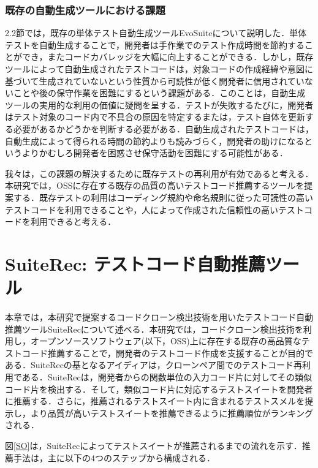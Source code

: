 \documentclass[12pt]{jarticle} %
\begin{document}
\subsubsection{既存の自動生成ツールにおける課題}

2.2節では，既存の単体テスト自動生成ツール{\sf EvoSuite}について説明した．単体テストを自動生成することで，開発者は手作業でのテスト作成時間を節約することができ，またコードカバレッジを大幅に向上することができる．しかし，既存ツールによって自動生成されたテストコードは，対象コードの作成経緯や意図に基づいて生成されていないという性質から可読性が低く開発者に信用されていないことや後の保守作業を困難にするという課題がある\cite{b14,b15,b13}．このことは，自動生成ツールの実用的な利用の価値に疑問を呈する．テストが失敗するたびに，開発者はテスト対象のコード内で不具合の原因を特定するまたは，テスト自体を更新する必要があるかどうかを判断する必要がある．自動生成されたテストコードは，自動生成によって得られる時間の節約よりも読みづらく，開発者の助けになるというよりかむしろ開発者を困惑させ保守活動を困難にする可能性がある\cite{b1}．


我々は，この課題の解決するために既存テストの再利用が有効であると考える．本研究では，OSSに存在する既存の品質の高いテストコード推薦するツールを提案する．既存テストの利用はコーディング規約や命名規則に従った可読性の高いテストコードを利用できることや，人によって作成された信頼性の高いテストコードを利用できると考える．


\newpage
\section{SuiteRec: テストコード自動推薦ツール}

本章では，本研究で提案するコードクローン検出技術を用いたテストコード自動推薦ツール{\sf SuiteRec}について述べる．本研究では，コードクローン検出技術を利用し，オープンソースソフトウェア(以下，OSS)上に存在する既存の高品質なテストコード推薦することで，開発者のテストコード作成を支援することが目的である．{\sf SuiteRec}の基となるアイディアは，クローンペア間でのテストコード再利用である．{\sf SuiteRec}は，開発者からの関数単位の入力コード片に対してその類似コード片を検出する．そして，類似コード片に対応するテストスイートを開発者に推薦する．さらに，推薦されるテストスイート内に含まれるテストスメルを提示し，より品質が高いテストスイートを推薦できるように推薦順位がランキングされる．

図\ref{SO}は，{\sf SuiteRec}によってテストスイートが推薦されるまでの流れを示す．推薦手法は，主に以下の4つのステップから構成される．
\end{document}
